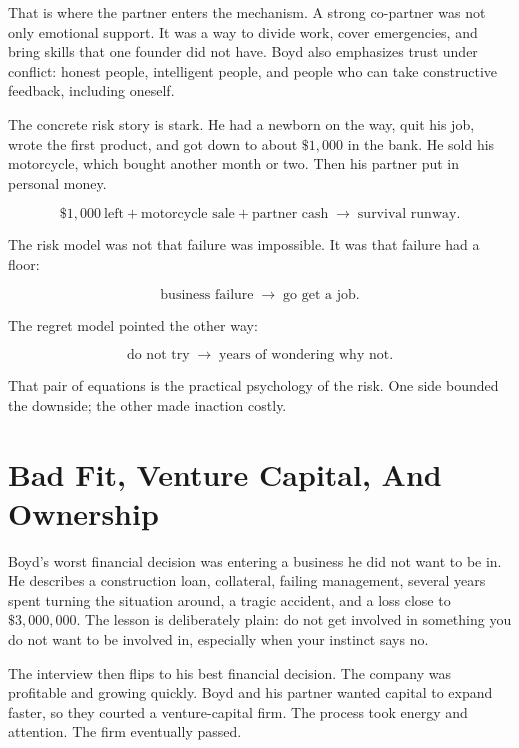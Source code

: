 That is where the partner enters the mechanism. A strong co-partner was not only emotional support. It was a way to divide work, cover emergencies, and bring skills that one founder did not have. Boyd also emphasizes trust under conflict: honest people, intelligent people, and people who can take constructive feedback, including oneself.

The concrete risk story is stark. He had a newborn on the way, quit his job, wrote the first product, and got down to about \(\$1{,}000\) in the bank. He sold his motorcycle, which bought another month or two. Then his partner put in personal money.

\begin{equation}
\$1{,}000\ \text{left}
+
\text{motorcycle sale}
+
\text{partner cash}
\;\longrightarrow\;
\text{survival runway}.
\end{equation}

The risk model was not that failure was impossible. It was that failure had a floor:

\begin{equation}
\text{business failure}
\;\longrightarrow\;
\text{go get a job}.
\end{equation}

The regret model pointed the other way:

\begin{equation}
\text{do not try}
\;\longrightarrow\;
\text{years of wondering why not}.
\end{equation}

That pair of equations is the practical psychology of the risk. One side bounded the downside; the other made inaction costly.

\section{Bad Fit, Venture Capital, And Ownership}

Boyd's worst financial decision was entering a business he did not want to be in. He describes a construction loan, collateral, failing management, several years spent turning the situation around, a tragic accident, and a loss close to \(\$3{,}000{,}000\). The lesson is deliberately plain: do not get involved in something you do not want to be involved in, especially when your instinct says no.

The interview then flips to his best financial decision. The company was profitable and growing quickly. Boyd and his partner wanted capital to expand faster, so they courted a venture-capital firm. The process took energy and attention. The firm eventually passed.

